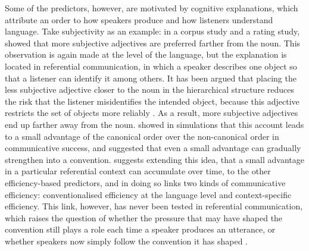 \documentclass[10pt,a4paper,fleqn]{article}
\begin{document}
Some of the predictors, however, are motivated by cognitive explanations, which attribute an order to how speakers produce and how listeners understand language.
Take subjectivity as an example: in a corpus study and a rating study, \citet{scontras2017subjectivity} showed that more subjective adjectives are preferred farther from the noun.
This observation is again made at the level of the language, but the explanation is located in referential communication, in which a speaker describes one object so that a listener can identify it among others.
It has been argued that placing the less subjective adjective closer to the noun in the hierarchical structure reduces the risk that the listener misidentifies the intended object, because this adjective restricts the set of objects more reliably \citep{scontras2019grammatical}.
As a result, more subjective adjectives end up farther away from the noun.
\citet{franke2019subjectivity} showed in simulations that this account leads to a small advantage of the canonical order over the non-canonical order in communicative success, and suggested that even a small advantage can gradually strengthen into a convention.
\citet{scontras2023adjective} suggests extending this idea, that a small advantage in a particular referential context can accumulate over time, to the other efficiency-based predictors, and in doing so links two kinds of communicative efficiency: conventionalised efficiency at the language level and context-specific efficiency.
This link, however, has never been tested in referential communication, which raises the question of whether the pressure that may have shaped the convention still plays a role each time a speaker produces an utterance, or whether speakers now simply follow the convention it has shaped \citep{scontras2019grammatical}.
\end{document}
